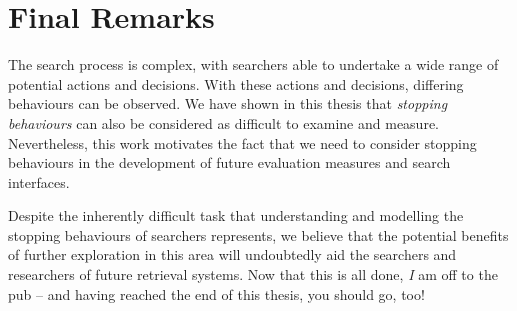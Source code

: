 \section{Final Remarks}\label{sec:conclusions:remarks}
The search process is complex, with searchers able to undertake a wide range of potential actions and decisions. With these actions and decisions, differing behaviours can be observed. We have shown in this thesis that \emph{stopping behaviours} can also be considered as difficult to examine and measure. Nevertheless, this work motivates the fact that we need to consider stopping behaviours in the development of future evaluation measures and search interfaces. 

Despite the inherently difficult task that understanding and modelling the stopping behaviours of searchers represents, we believe that the potential benefits of further exploration in this area will undoubtedly aid the searchers and researchers of future retrieval systems. Now that this is all done, \emph{I} am off to the pub -- and having reached the end of this thesis, you should go, too!